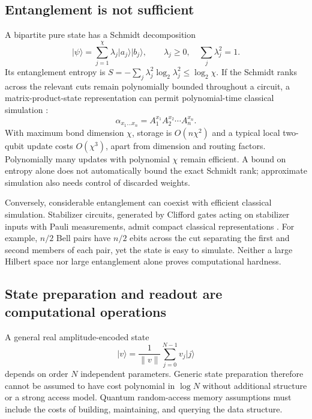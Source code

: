 \documentclass[11pt,a4paper]{article}
\newcommand{\ket}[1]{\lvert #1\rangle}
\theoremstyle{definition}
\theoremstyle{remark}
\numberwithin{equation}{section}
\begin{document}
\subsection{Entanglement is not sufficient}
A bipartite pure state has a Schmidt decomposition
\begin{equation}
 \ket{\psi}=\sum_{j=1}^{\chi}\lambda_j\ket{a_j}\ket{b_j},\qquad
 \lambda_j\geq0,\quad \sum_j\lambda_j^2=1.
\end{equation}
Its entanglement entropy is
$S=-\sum_j\lambda_j^2\log_2\lambda_j^2\leq\log_2\chi$.
If the Schmidt ranks across the relevant cuts remain polynomially bounded
throughout a circuit, a matrix-product-state representation can permit
polynomial-time classical simulation \citep{vidal2003}:
\begin{equation}
 \alpha_{x_1\ldots x_n}=A_1^{x_1}A_2^{x_2}\cdots A_n^{x_n}.
\end{equation}
With maximum bond dimension $\chi$, storage is $O(n\chi^2)$ and a typical
local two-qubit update costs $O(\chi^3)$, apart from dimension and routing
factors. Polynomially many updates with polynomial $\chi$ remain efficient.
A bound on entropy alone does not automatically bound the exact Schmidt
rank; approximate simulation also needs control of discarded weights.

Conversely, considerable entanglement can coexist with efficient classical
simulation. Stabilizer circuits, generated by Clifford gates acting on
stabilizer inputs with Pauli measurements, admit compact classical
representations \citep{aaronson2004}. For example, $n/2$ Bell pairs have
$n/2$ ebits across the cut separating the first and second members of each
pair, yet the state is easy to simulate. Neither a large Hilbert space nor
large entanglement alone proves computational hardness.

\subsection{State preparation and readout are computational operations}
A general real amplitude-encoded state
\begin{equation}
 \ket{v}=\frac1{\|v\|}\sum_{j=0}^{N-1}v_j\ket{j}
\end{equation}
depends on order $N$ independent parameters. Generic state preparation
therefore cannot be assumed to have cost polynomial in $\log N$ without
additional structure or a strong access model. Quantum random-access memory
assumptions must include the costs of building, maintaining, and querying
the data structure.
\end{document}
